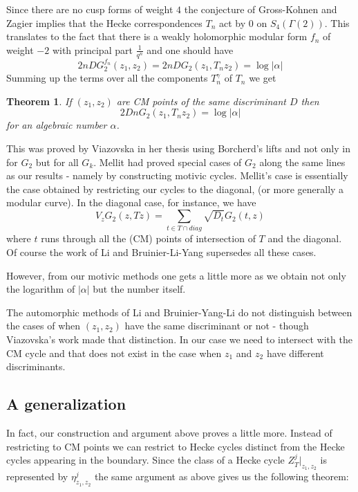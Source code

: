 \documentclass[11pt,a4paper]{article}
\newtheorem{thm}[defn]{Theorem}
\begin{document}
Since there are no cusp forms of weight $4$ the conjecture of Gross-Kohnen and Zagier implies that the Hecke correspondences $T_n$ act by $0$ on $S_4(\Gamma(2))$. This translates to the fact that there is a weakly holomorphic modular form $f_n$ of weight $-2$ with principal part $\frac{1}{q^n}$ and one should have 
%
$$2nDG^{f_n}_2(z_1,z_2)=2nDG_2(z_1,T_nz_2)=\log|\alpha|$$
% 
Summing up the terms over all the  components  $T^{\gamma}_n$ of $T_n$ we get 

\begin{thm} If $(z_1,z_2)$ are CM points of the same discriminant $D$ then 
	$$2DnG_2(z_1,T_nz_2)=\log|\alpha|$$
	for an algebraic number $\alpha$. 
	
\end{thm}

This was  proved by Viazovska \cite{viaz} in her thesis using Borcherd's lifts and not only in for $G_2$ but for all $G_k$. Mellit had proved special cases of $G_2$ along the same lines as our results - namely by constructing motivic cycles. Mellit's case is essentially the case obtained by restricting our cycles to the diagonal, (or more generally a modular curve). In the diagonal case, for instance, we have 
%
$$V_z G_2(z,Tz)=\sum_{t \in T \cap diag} \sqrt{D_t}G_2(t,z)$$
%
where $t$ runs through all the (CM) points of intersection of $T$ and the diagonal. Of course the work of Li and Bruinier-Li-Yang supersedes all these cases. 

However, from our motivic methods one gets a little more as we obtain not only the logarithm of $|\alpha|$ but the number itself. 

The automorphic methods of Li and Bruinier-Yang-Li do not distinguish between the cases of when $(z_1,z_2)$ have the same discriminant or not - though Viazovska's work made that distinction. In our case we need to intersect with the CM cycle and that does not exist in the case when $z_1$ and $z_2$ have different discriminants. 


\subsection{A generalization}

In fact, our construction and argument above proves a little more. Instead of restricting to CM points we can restrict to Hecke cycles distinct from the Hecke cycles appearing in the boundary. Since the class of a Hecke cycle $Z^j_{T}|_{z_1,z_2}$ is represented by $\eta^j_{z_1,z_2}$ the same argument as above gives us the following theorem: 
\end{document}
